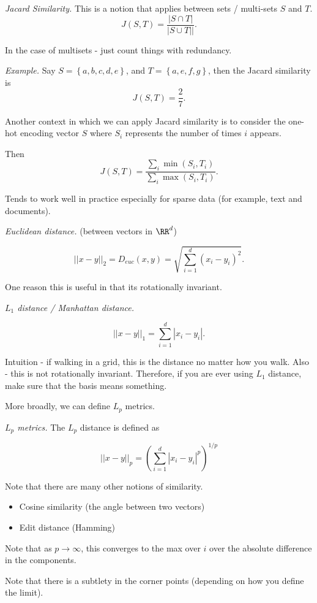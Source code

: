 {\it Jacard Similarity.} This is a notion that applies between sets / multi-sets $S$ and $T$.
\[
  J(S, T) = \frac{|S \cap T |}{|S \cup T||}.
\]

In the case of multisets - just count things with redundancy.

{\it Example.} Say $S = \left\{ a, b, c, d, e \right\}$, and $T = \left\{ a, e, f, g \right\}$, then the Jacard similarity is
\[
  J(S, T) = \frac{2}{7}.
\]

Another context in which we can apply Jacard similarity is to consider the one-hot encoding vector $S$ where $S_i$ represents the number of times $i$ appears.

Then
\[
  J(S, T) = \frac{\sum_{i} \min(S_i, T_i)}{\sum_{i} \max (S_i, T_i)}.
\]

Tends to work well in practice especially for sparse data (for example, text and documents).

{\it Euclidean distance.} (between vectors in $\RR^d$)

\[
  ||x-y||_2 = D_{euc} (x, y) = \sqrt{\sum_{i=1}^{d} (x_i - y_i)^2}.
\]

One reason this is useful in that its rotationally invariant.

{\it $L_1$ distance / Manhattan distance.} 

\[
  ||x - y||_1 = \sum_{i=1}^{d} |x_i - y_i|.
\]

Intuition - if walking in a grid, this is the distance no matter how you walk.  Also - this is not rotationally invariant.  Therefore, if you are ever using $L_1$ distance, make sure that the basis means something.

More broadly, we can define $L_p$ metrics.

{\it $L_p$ metrics.} The $L_p$ distance is defined as

\[
  ||x - y||_p = \left ( \sum_{i=1}^{d} |x_i - y_i|^{p} \right )^{1/p}
\]

Note that there are many other notions of similarity.  

\begin{itemize}
  \item Cosine similarity (the angle between two vectors)
  \item Edit distance (Hamming)
\end{itemize}

Note that as $p \to \infty$, this converges to the max over $i$ over the absolute difference in the components.

Note that there is a subtlety in the corner points (depending on how you define the limit).

